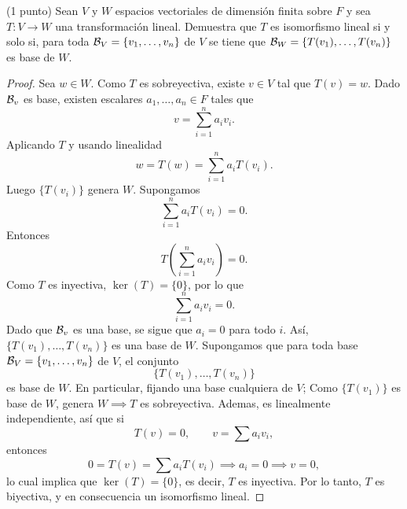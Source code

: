 \documentclass[12pt,a4paper]{article}
\newcommand{\paren}[1]{\left( #1 \right)}
\begin{document}
    \begin{mdframed}[style=mdpinkbox,frametitle={Ejercicio 3}]
        (1 punto) Sean $V$ y $W$ espacios vectoriales de dimensión finita sobre $F$ y sea $T:V\to W$ una
        transformación lineal. Demuestra que $T$ es isomorfismo lineal si y solo si, para toda
        $\mathcal{B}_{V}=\{v_{1},\dots,v_{n}\}$ de $V$ se tiene que $\mathcal{B}_{W}=\{T(v_{1}),\dots,T(v_{n})\}$
        es base de $W$.
    \end{mdframed}

    \begin{proof}
        Sea $w\in W$. Como $T$ es sobreyectiva, existe $v\in V$ tal que $T(v)=w$. Dado $\mathcal{B}_{v}$
        es base, existen escalares $a_{1},\dots,a_{n}\in F$ tales que
        \begin{equation*}
            v=\sum_{i=1}^{n}a_{i}v_{i}.
        \end{equation*}
        Aplicando $T$ y usando linealidad
        \begin{equation*}
            w=T(w)=\sum_{i=1}^{n}a_{i}T(v_{i}).
        \end{equation*}
        Luego $\{T(v_{i})\}$ genera $W$. Supongamos
        \begin{equation*}
            \sum_{i=1}^{n}a_{i}T(v_{i})=0.
        \end{equation*}
        Entonces
        \begin{equation*}
            T\paren{\sum_{i=1}^{n}a_{i}v_{i}}=0.
        \end{equation*}
        Como $T$ es inyectiva, $\ker(T)=\{0\}$, por lo que
        \begin{equation*}
            \sum_{i=1}^{n}a_{i}v_{i}=0.
        \end{equation*}
        Dado que $\mathcal{B}_{v}$ es una base, se sigue que $a_{i}=0$ para todo $i$. Así, $\{T(v_{1}),\dots,T(v_{n})\}$
        es una base de $W$. Supongamos que para toda base $\mathcal{B}_{V}=\{v_{1},\dots,v_{n}\}$ de $V$, el conjunto
        \begin{equation*}
            \{T(v_{1}),\dots,T(v_{n})\}
        \end{equation*}
        es base de $W$. En particular, fijando una base cualquiera de $V$; Como $\{T(v_{1})\}$ es base
        de $W$, genera $W\implies T$ es sobreyectiva. Ademas, es linealmente independiente, así que si
        \begin{equation*}
            T(v)=0,\qquad v=\sum a_{i}v_{i},
        \end{equation*}
        entonces
        \begin{equation*}
            0=T(v)=\sum a_{i}T(v_{i})\implies a_{i}=0\implies v=0,
        \end{equation*}
        lo cual implica que $\ker(T)=\{0\}$, es decir, $T$ es inyectiva. Por lo tanto,
        $T$ es biyectiva, y en consecuencia un isomorfismo lineal.
    \end{proof}
\end{document}
